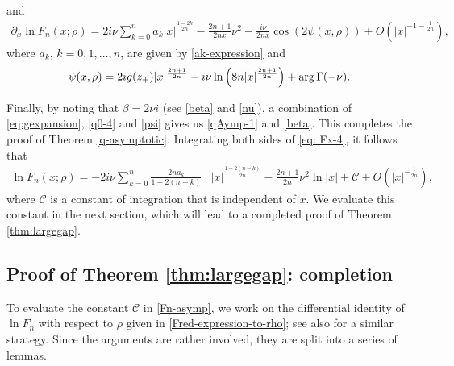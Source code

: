 \documentclass[11pt,a4paper]{article}
\numberwithin{equation}{section}
\def\arg {\mathop{\rm arg}\nolimits}
\begin{document}
and
\begin{align}\label{eq: Fx-4}
\partial_x\ln{F}_n(x;\rho)
=2i\nu\sum_{k=0}^{n}a_k|x|^{\frac{1-2k}{2n}}-\frac{2n+1}{2nx}\nu^2
-\frac{i\nu}{2nx}\cos\left(2\psi(x,\rho)\right)+O\left(|x|^{-1-\frac{1}{2n}}\right),
\end{align}
where $a_k$, $k=0,1,\ldots,n$, are given by \eqref{ak-expression} and
\begin{equation}\label{psi}
\psi(x,\rho)=2ig(z_+)|x|^{\frac{2n+1}{2n}}-i\nu\ln\left(8n|x|^{\frac{2n+1}{2n}}\right)
+\arg\Gamma(-\nu).
\end{equation}

Finally, by noting that $\beta=2\nu i$ (see \eqref{beta} and \eqref{nu}), a combination of \eqref{eq:gexpansion}, \eqref{q0-4} and  \eqref{psi} gives us \eqref{qAymp-1} and \eqref{beta}. This completes the proof of Theorem \ref{q-asymptotic}. Integrating both sides of \eqref{eq: Fx-4}, it follows that
\begin{align}\label{Fn-asymp}
\ln{F}_n(x;\rho)=
-2i\nu\sum_{k=0}^{n}\frac{2na_k}{1+2(n-k)}&|x|^{\frac{1+2(n-k)}{2n}}
-\frac{2n+1}{2n}\nu^2\ln|x|+\mathcal{C}+O\left(|x|^{-\frac{1}{2n}}\right),
\end{align}
where $\mathcal{C}$ is a constant of integration that is independent of $x$. We evaluate this constant in the next section, which will lead to a completed proof of Theorem \ref{thm:largegap}.





\subsection{Proof of Theorem \ref{thm:largegap}: completion}\label{subsec:proof2}
To evaluate the constant $\mathcal{C}$ in \eqref{Fn-asymp}, we work on the differential identity of $\ln{F}_n$ with respect to $\rho$ given in \eqref{Fred-expression-to-rho}; see also \cite{CC2021} for a similar strategy. Since the arguments are rather involved, they are split into a series of lemmas.
\end{document}
